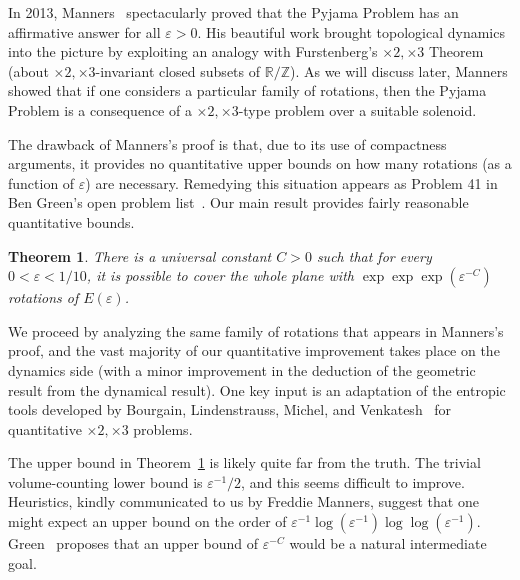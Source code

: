 \documentclass[11pt]{amsart}
\newtheorem{theorem}[lemma]{Theorem}
\theoremstyle{definition}
\begin{document}
In 2013, Manners~\cite{Man13} spectacularly proved that the Pyjama Problem has an affirmative answer for all $\varepsilon>0$.  His beautiful work brought topological dynamics into the picture by exploiting an analogy with Furstenberg's $\times 2, \times 3$ Theorem (about $\times 2, \times 3$-invariant closed subsets of $\mathbb{R}/\mathbb{Z}$).  As we will discuss later, Manners showed that if one considers a particular family of rotations, then the Pyjama Problem is a consequence of a $\times 2, \times 3$-type problem over a suitable solenoid.

The drawback of Manners's proof is that, due to its use of compactness arguments, it provides no quantitative upper bounds on how many rotations (as a function of $\varepsilon$) are necessary.  Remedying this situation appears as Problem 41 in Ben Green's open problem list~\cite{green2024100}.  Our main result provides fairly reasonable quantitative bounds.

\begin{theorem}\label{thm:main}
There is a universal constant $C>0$ such that for every $0 <\varepsilon<1/10$, it is possible to cover the whole plane with $\exp\exp\exp(\varepsilon^{-C})$ rotations of $E(\varepsilon)$.
\end{theorem}

We proceed by analyzing the same family of rotations that appears in Manners's proof, and the vast majority of our quantitative improvement takes place on the dynamics side (with a minor improvement in the deduction of the geometric result from the dynamical result).  %
One key input is an adaptation of the entropic tools developed by Bourgain, Lindenstrauss, Michel, and Venkatesh~\cite{BLMV08} for quantitative $\times 2, \times 3$ problems.

The upper bound in Theorem~\ref{thm:main} is likely quite far from the truth.  The trivial volume-counting lower bound is $\varepsilon^{-1}/2$, and this seems difficult to improve.  Heuristics, kindly communicated to us by Freddie Manners, suggest that one might expect an upper bound on the order of $\varepsilon^{-1} \log (\varepsilon^{-1}) \log \log (\varepsilon^{-1})$.  Green~\cite{green2024100} proposes that an upper bound of $\varepsilon^{-C}$ would be a natural intermediate goal.
\end{document}
